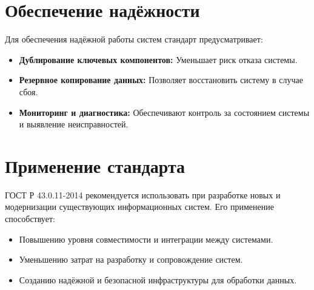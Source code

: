 \section*{Обеспечение надёжности}
Для обеспечения надёжной работы систем стандарт предусматривает:
\begin{itemize}
    \item \textbf{Дублирование ключевых компонентов:} Уменьшает риск отказа системы.
    \item \textbf{Резервное копирование данных:} Позволяет восстановить систему в случае сбоя.
    \item \textbf{Мониторинг и диагностика:} Обеспечивают контроль за состоянием системы и выявление неисправностей.
\end{itemize}

\section*{Применение стандарта}
ГОСТ Р 43.0.11-2014 рекомендуется использовать при разработке новых и модернизации существующих информационных систем. Его применение способствует:
\begin{itemize}
    \item Повышению уровня совместимости и интеграции между системами.
    \item Уменьшению затрат на разработку и сопровождение систем.
    \item Созданию надёжной и безопасной инфраструктуры для обработки данных.
\end{itemize}